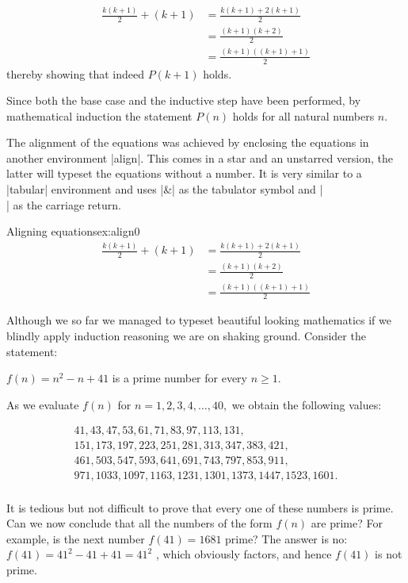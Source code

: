 \begin{align}
\frac{k(k + 1)}{2} + (k+1) & = \frac {k(k+1)+2(k+1)} 2 \\
& = \frac{(k+1)(k+2)}{2} \\
& = \frac{(k+1)((k+1) + 1)}{2}
\end{align}
thereby showing that indeed  $P(k + 1)$ holds.

Since both the base case and the inductive step have been performed, by mathematical induction the statement $P(n)$ holds for all natural numbers $n$.

The alignment of the equations was achieved by enclosing the equations in another environment |align|. This comes in a star and an unstarred version, the latter will typeset the equations without a number. It is very similar to a |tabular| environment and uses |&| as the tabulator symbol and |\\| as the carriage return.

\begin{texexample}{Aligning equations}{ex:align0}
\begin{align}
\frac{k(k + 1)}{2} + (k+1) & = \frac {k(k+1)+2(k+1)} 2 \\
& = \frac{(k+1)(k+2)}{2} \\
& = \frac{(k+1)((k+1) + 1)}{2}
\end{align}
\end{texexample}

Although we so far we managed to typeset beautiful looking mathematics if we blindly apply induction reasoning we are on shaking ground. Consider the statement:

$f(n) = n^2 - n +41$ is a prime number for every $n\ge1$. 

As we evaluate $f(n)$ for $n = 1,2,3,4,\dots,40,$ we obtain the following values:

\begin{gather*}
41,43,47,53,61,71,83,97,113,131, \\
151,173,197,223,251,281,313,347,383,421, \\
461,503,547,593,641,691,743,797,853,911, \\
971,1033,1097,1163,1231,1301,1373,1447,1523,1601. \\
\end{gather*}

It is tedious but not difficult to prove that every one of these 
numbers is prime. Can we now conclude that all the numbers of the form $f(n)$ 
are prime? For example, is the next number $f(41) = 1681$ prime? The answer is no: $f(41) = 41^2 -41 + 41 = 41^2$ , which obviously factors, and hence 
$f(41)$ is not prime. 




